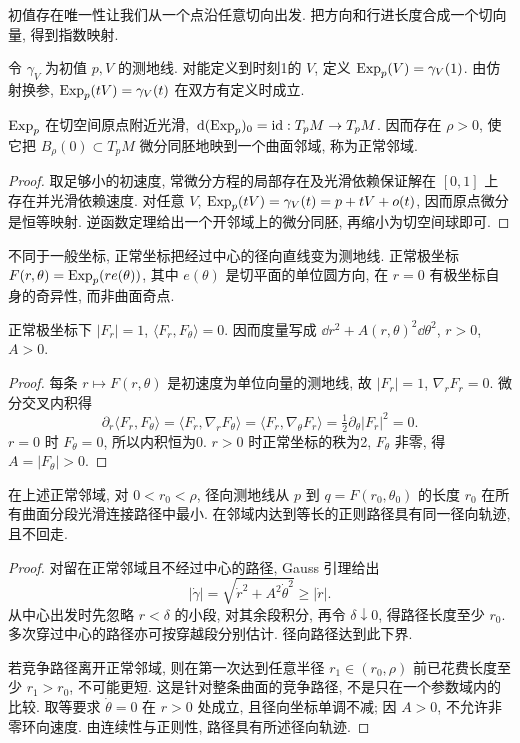 初值存在唯一性让我们从一个点沿任意切向出发. 把方向和行进长度合成一个切向量, 得到指数映射.
\begin{definition}
令 $\gamma_V$ 为初值 $p,V$ 的测地线. 对能定义到时刻1的 $V$, 定义 $\operatorname{Exp}_p(V)=\gamma_V(1)$. 由仿射换参, $\operatorname{Exp}_p(tV)=\gamma_V(t)$ 在双方有定义时成立.
\end{definition}
\begin{proposition}\label{prop:normal-neighborhood}
$\operatorname{Exp}_p$ 在切空间原点附近光滑, $\,\mathrm d(\operatorname{Exp}_p)_0=\operatorname{id}:T_pM\to T_pM$. 因而存在 $\rho>0$, 使它把 $B_\rho(0)\subset T_pM$ 微分同胚地映到一个曲面邻域, 称为正常邻域.
\end{proposition}
\begin{proof}
取足够小的初速度, 常微分方程的局部存在及光滑依赖保证解在 $[0,1]$ 上存在并光滑依赖速度. 对任意 $V$, $\operatorname{Exp}_p(tV)=\gamma_V(t)=p+tV+o(t)$, 因而原点微分是恒等映射. 逆函数定理给出一个开邻域上的微分同胚, 再缩小为切空间球即可.
\end{proof}
不同于一般坐标, 正常坐标把经过中心的径向直线变为测地线. 正常极坐标 $F(r,\theta)=\operatorname{Exp}_p(r e(\theta))$, 其中 $e(\theta)$ 是切平面的单位圆方向, 在 $r=0$ 有极坐标自身的奇异性, 而非曲面奇点.
\begin{theorem}[Gauss 引理]\label{thm:gauss-lemma}
正常极坐标下 $|F_r|=1$, $\langle F_r,F_\theta\rangle=0$. 因而度量写成 $\dd r^2+A(r,\theta)^2\dd\theta^2$, $r>0$, $A>0$.
\end{theorem}
\begin{proof}
每条 $r\mapsto F(r,\theta)$ 是初速度为单位向量的测地线, 故 $|F_r|=1$, $\nabla_rF_r=0$. 微分交叉内积得
\[
 \partial_r\langle F_r,F_\theta\rangle
 =\langle F_r,\nabla_rF_\theta\rangle
 =\langle F_r,\nabla_\theta F_r\rangle
 =\tfrac12\partial_\theta|F_r|^2=0.
\]
$r=0$ 时 $F_\theta=0$, 所以内积恒为0. $r>0$ 时正常坐标的秩为2, $F_\theta$ 非零, 得 $A=|F_\theta|>0$.
\end{proof}
\begin{theorem}\label{thm:local-minimizing}
在上述正常邻域, 对 $0<r_0<\rho$, 径向测地线从 $p$ 到 $q=F(r_0,\theta_0)$ 的长度 $r_0$ 在所有曲面分段光滑连接路径中最小. 在邻域内达到等长的正则路径具有同一径向轨迹, 且不回走.
\end{theorem}
\begin{proof}
对留在正常邻域且不经过中心的路径, Gauss 引理给出
\[
 |\dot\gamma|=\sqrt{\dot r^2+A^2\dot\theta^2}\ge|\dot r|.
\]
从中心出发时先忽略 $r<\delta$ 的小段, 对其余段积分, 再令 $\delta\downarrow0$, 得路径长度至少 $r_0$. 多次穿过中心的路径亦可按穿越段分别估计. 径向路径达到此下界.

若竞争路径离开正常邻域, 则在第一次达到任意半径 $r_1\in(r_0,\rho)$ 前已花费长度至少 $r_1>r_0$, 不可能更短. 这是针对整条曲面的竞争路径, 不是只在一个参数域内的比较. 取等要求 $\dot\theta=0$ 在 $r>0$ 处成立, 且径向坐标单调不减; 因 $A>0$, 不允许非零环向速度. 由连续性与正则性, 路径具有所述径向轨迹.
\end{proof}
